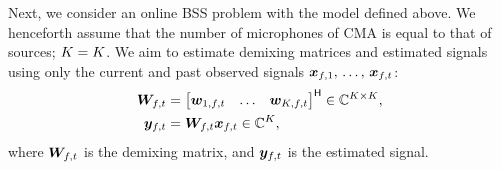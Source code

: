 \documentclass[sip,biber]{now-journal}
\begin{document}
Next, we consider an online BSS problem with the model defined above.
We henceforth assume that the number of microphones of CMA is equal to that of sources; $\Mic = \Src$.
\renewcommand{\Mic}{\Src}%
We aim to estimate demixing matrices and estimated signals using only the current and past observed signals $\bm{x} _{f,1},\, \dots,\, \bm{x} _{f,t}$:
\begin{align}
  \Demix _{\ft} &= \begin{bmatrix} \demix _{1,\ft} & \dots & \demix _{\Src,\ft} \end{bmatrix} ^{\hermite} \in \C ^{\Src \times \Mic}, \\
  \Est _{\ft} &= \Demix _{\ft} \Obs _{\ft} \in \C ^{\Src},\label{eq:bss:sep}
\end{align}
where $\Demix _{\ft}$ is the demixing matrix, and $\Est _{\ft}$ is the estimated signal.
\end{document}
